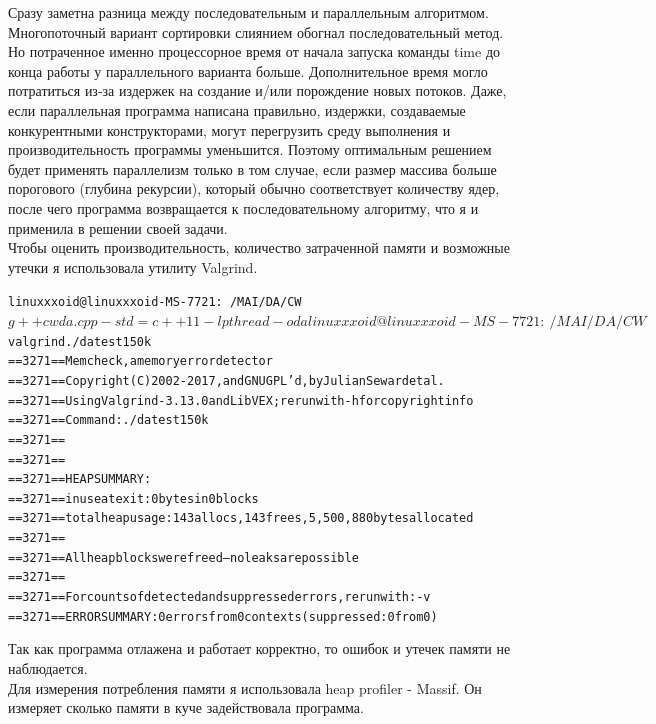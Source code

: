 Сразу заметна разница между последовательным и параллельным алгоритмом. Многопоточный вариант сортировки слиянием обогнал последовательный метод. Но потраченное именно процессорное время от начала запуска команды time до конца работы у параллельного варианта больше. Дополнительное время могло потратиться из-за издержек на создание и/или порождение новых потоков. Даже, если параллельная программа написана правильно, издержки, создаваемые конкурентными конструкторами, могут перегрузить среду выполнения и производительность программы уменьшится. Поэтому оптимальным решением будет применять параллелизм только в том случае, если размер массива больше порогового (глубина рекурсии), который обычно соответствует количеству ядер, после чего программа возвращается к последовательному алгоритму, что я и применила в решении своей задачи. 
\\
Чтобы оценить производительность, количество затраченной памяти и возможные утечки я использовала утилиту Valgrind.
\begin{alltt}
linuxxxoid@linuxxxoid-MS-7721:~/MAI/DA/CW$ g++ cwda.cpp -std=c++11 -lpthread -o da
linuxxxoid@linuxxxoid-MS-7721:~/MAI/DA/CW$ valgrind ./da test150k
==3271== Memcheck, a memory error detector
==3271== Copyright (C) 2002-2017, and GNU GPL'd, by Julian Seward et al.
==3271== Using Valgrind-3.13.0 and LibVEX; rerun with -h for copyright info
==3271== Command: ./da test150k
==3271==
==3271==
==3271== HEAP SUMMARY:
==3271==     in use at exit: 0 bytes in 0 blocks
==3271==   total heap usage: 143 allocs, 143 frees, 5,500,880 bytes allocated
==3271==
==3271== All heap blocks were freed -- no leaks are possible
==3271==
==3271== For counts of detected and suppressed errors, rerun with: -v
==3271== ERROR SUMMARY: 0 errors from 0 contexts (suppressed: 0 from 0)
\end{alltt}
Так как программа отлажена и работает корректно, то ошибок и утечек памяти не наблюдается.
\\
Для измерения потребления памяти я использовала heap profiler - Massif. Он измеряет сколько памяти в куче задействовала программа.

